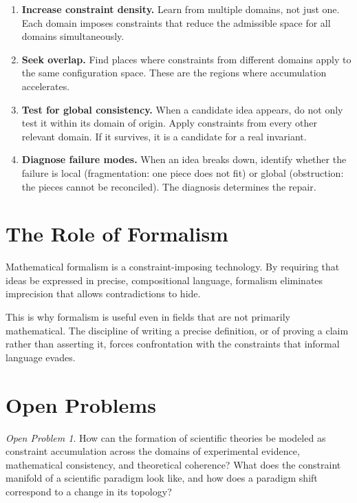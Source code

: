 \documentclass[11pt]{book}
\theoremstyle{plain}
\theoremstyle{definition}
\theoremstyle{remark}
\newtheorem{openproblem}[theorem]{Open Problem}
\begin{document}
\begin{enumerate}
  \item \textbf{Increase constraint density.} Learn from multiple domains,
        not just one. Each domain imposes constraints that reduce the
        admissible space for all domains simultaneously.
  \item \textbf{Seek overlap.} Find places where constraints from different
        domains apply to the same configuration space. These are the regions
        where accumulation accelerates.
  \item \textbf{Test for global consistency.} When a candidate idea appears,
        do not only test it within its domain of origin. Apply constraints
        from every other relevant domain. If it survives, it is a candidate
        for a real invariant.
  \item \textbf{Diagnose failure modes.} When an idea breaks down, identify
        whether the failure is local (fragmentation: one piece does not fit)
        or global (obstruction: the pieces cannot be reconciled). The
        diagnosis determines the repair.
\end{enumerate}

\section{The Role of Formalism}

Mathematical formalism is a constraint-imposing technology. By requiring
that ideas be expressed in precise, compositional language, formalism
eliminates imprecision that allows contradictions to hide.

This is why formalism is useful even in fields that are not primarily
mathematical. The discipline of writing a precise definition, or of
proving a claim rather than asserting it, forces confrontation with
the constraints that informal language evades.

\section{Open Problems}

\begin{openproblem}
How can the formation of scientific theories be modeled as constraint
accumulation across the domains of experimental evidence, mathematical
consistency, and theoretical coherence? What does the constraint manifold
of a scientific paradigm look like, and how does a paradigm shift correspond
to a change in its topology?
\end{openproblem}
\end{document}
